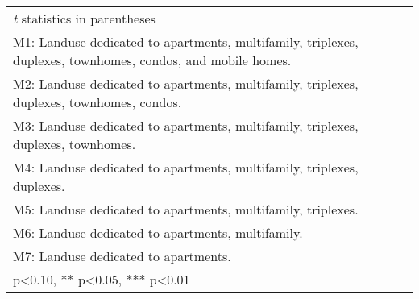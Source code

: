 \begin{table}[htbp]
\begin{tabular}{l*{8}{c}}
\bottomrule
\multicolumn{9}{l}{\footnotesize \textit{t} statistics in parentheses}\\
\multicolumn{9}{l}{\footnotesize M1: Landuse dedicated to apartments, multifamily, triplexes, duplexes, townhomes, condos, and mobile homes.}\\
\multicolumn{9}{l}{\footnotesize M2: Landuse dedicated to apartments, multifamily, triplexes, duplexes, townhomes, condos.}\\
\multicolumn{9}{l}{\footnotesize M3: Landuse dedicated to apartments, multifamily, triplexes, duplexes, townhomes.}\\
\multicolumn{9}{l}{\footnotesize M4: Landuse dedicated to apartments, multifamily, triplexes, duplexes.}\\
\multicolumn{9}{l}{\footnotesize M5: Landuse dedicated to apartments, multifamily, triplexes.}\\
\multicolumn{9}{l}{\footnotesize M6: Landuse dedicated to apartments, multifamily.}\\
\multicolumn{9}{l}{\footnotesize M7: Landuse dedicated to apartments.}\\
\multicolumn{9}{l}{\footnotesize * p<0.10, ** p<0.05, *** p<0.01}\\
\end{tabular}
\end{table}
